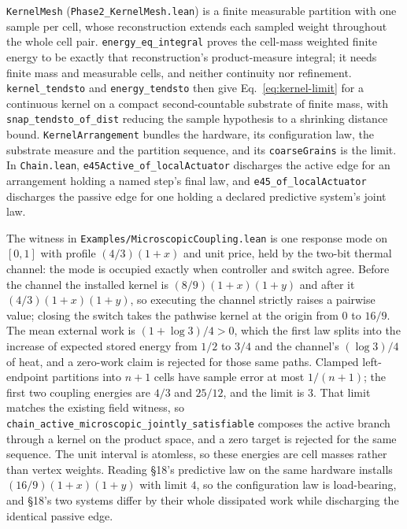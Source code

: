 \documentclass{article}
\begin{document}
\texttt{KernelMesh} (\nolinkurl{Phase2_KernelMesh.lean}) is a finite
measurable partition with one sample per cell,
whose reconstruction extends each sampled weight throughout the whole cell
pair. \nolinkurl{energy_eq_integral} proves the
cell-mass weighted finite energy to be exactly that reconstruction's
product-measure integral; it needs finite mass and measurable cells, and
neither continuity nor refinement. \nolinkurl{kernel_tendsto} and
\nolinkurl{energy_tendsto} then give Eq.~\eqref{eq:kernel-limit} for a continuous kernel on a compact
second-countable substrate of finite mass, with
\nolinkurl{snap_tendsto_of_dist} reducing
the sample hypothesis to a shrinking distance bound.
\texttt{KernelArrangement} bundles the hardware, its configuration law, the
substrate measure and the partition sequence, and its
\texttt{coarseGrains} is the limit. In \texttt{Chain.lean},
\nolinkurl{e45Active_of_localActuator} discharges the
active edge for an arrangement holding a named step's final law, and
\nolinkurl{e45_of_localActuator} discharges the passive
edge for one holding a declared predictive system's joint law.

The witness in \nolinkurl{Examples/MicroscopicCoupling.lean} is one
response mode on $[0,1]$ with profile $(4/3)(1+x)$ and unit price, held by the
two-bit thermal channel: the mode is occupied exactly when controller and
switch agree. Before the channel the installed kernel is
$(8/9)(1+x)(1+y)$ and after it $(4/3)(1+x)(1+y)$, so executing the channel
strictly raises a pairwise value; closing the switch takes the pathwise kernel
at the origin from $0$ to $16/9$. The mean external work is
$(1+\log3)/4>0$, which the first law splits into the increase of expected stored
energy from $1/2$ to $3/4$ and the channel's $(\log3)/4$ of heat, and a zero-work
claim is rejected for those same paths. Clamped left-endpoint partitions into
$n+1$ cells have sample error at most $1/(n+1)$; the first two coupling
energies are $4/3$ and $25/12$, and the limit is $3$. That limit matches the
existing field witness, so
\nolinkurl{chain_active_microscopic_jointly_satisfiable}
composes the active branch through a kernel on the product space, and a zero
target is rejected for the same sequence. The unit interval is atomless, so
these energies are cell masses rather than vertex weights. Reading \S18's
predictive law on the same hardware installs $(16/9)(1+x)(1+y)$ with limit
$4$, so the configuration law is load-bearing, and \S18's two systems differ by
their whole dissipated work while discharging the identical passive edge.
\end{document}
